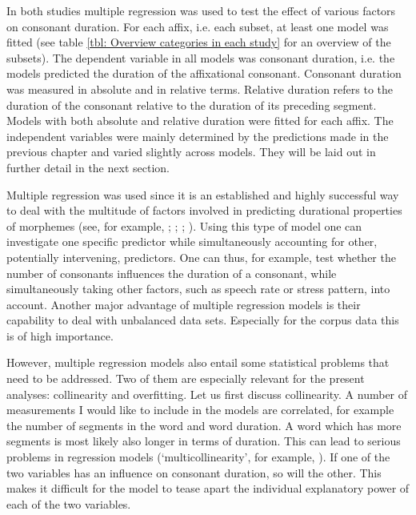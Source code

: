 
In both studies multiple regression was used to test the effect of various factors on consonant duration. For each affix, i.e. each subset, at least one model was fitted (see table \ref{tbl: Overview categories in each study} for an overview of the subsets). The dependent variable in all models was consonant duration, i.e. the models predicted the duration of the affixational consonant. Consonant duration was measured in absolute and in relative terms. Relative duration refers to the duration of the consonant relative to the duration of its preceding segment. Models with both absolute and relative duration were fitted for each affix.
The independent variables were mainly determined by the predictions made in the previous chapter and varied slightly across models. They will be laid out in further detail in the next section.

Multiple regression was used since it is an established and highly successful way to deal with the multitude of factors involved in predicting durational properties of morphemes (see, for example, \citealt{Hay.2007}; \citealt{Hanique.2012}; \citealt{Smith.2012}; \citealt{Plag.2017}). Using this type of model one can investigate one specific predictor while simultaneously accounting for other, potentially intervening, predictors. One can thus, for example, test whether the number of consonants influences the duration of a consonant, while simultaneously taking other factors, such as speech rate or stress pattern, into account.  Another major advantage of multiple regression models is their capability to deal with unbalanced data sets. Especially for the corpus data this is of high importance. 

However, multiple regression models also entail some statistical problems that need to be addressed. Two of them are especially relevant for the present analyses: collinearity and overfitting. Let us first discuss collinearity.
A number of measurements I would like to include in the models are correlated, for example the number of segments in the word and word duration. A word which has more segments is most likely also longer in terms of duration. This can lead to serious problems in regression models (`multicollinearity', for example, \citealt[chapter 6]{Baayen.2008}).  If one of the two variables has an influence on consonant duration, so will the other. This makes it difficult for the model to tease apart the individual explanatory power of each of the two variables. 

